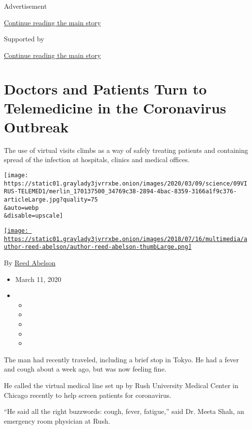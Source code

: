 Advertisement

\protect\hyperlink{after-top}{Continue reading the main story}

Supported by

\protect\hyperlink{after-sponsor}{Continue reading the main story}

\hypertarget{doctors-and-patients-turn-to-telemedicine-in-the-coronavirus-outbreak}{%
\section{Doctors and Patients Turn to Telemedicine in the Coronavirus
Outbreak}\label{doctors-and-patients-turn-to-telemedicine-in-the-coronavirus-outbreak}}

The use of virtual visits climbs as a way of safely treating patients
and containing spread of the infection at hospitals, clinics and medical
offices.

\texttt{[image: https://static01.graylady3jvrrxbe.onion/images/2020/03/09/science/09VIRUS-TELEMED1/merlin\_170137500\_34769c38-2894-4bac-8359-3166a1f9c376-articleLarge.jpg?quality=75\\\&auto=webp\\\&disable=upscale]}

\href{https://www.nytimes3xbfgragh.onion/by/reed-abelson}{\texttt{[image: https://static01.graylady3jvrrxbe.onion/images/2018/07/16/multimedia/author-reed-abelson/author-reed-abelson-thumbLarge.png]}}

By \href{https://www.nytimes3xbfgragh.onion/by/reed-abelson}{Reed
Abelson}

\begin{itemize}
\item
  March 11, 2020
\item
  \begin{itemize}
  \item
  \item
  \item
  \item
  \item
  \end{itemize}
\end{itemize}

The man had recently traveled, including a brief stop in Tokyo. He had a
fever and cough about a week ago, but was now feeling fine.

He called the virtual medical line set up by Rush University Medical
Center in Chicago recently to help screen patients for coronavirus.

``He said all the right buzzwords: cough, fever, fatigue,'' said Dr.
Meeta Shah, an emergency room physician at Rush.

